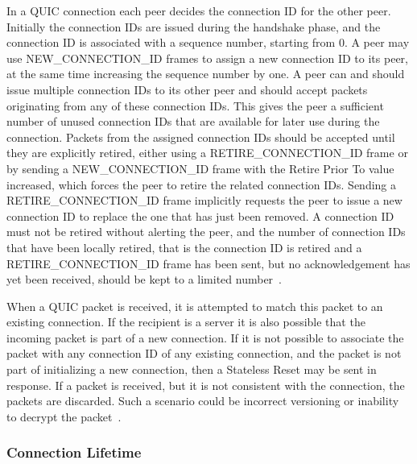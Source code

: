 \documentclass[english, 12pt, a4paper, elec, utf8, a-2b, online]{aaltothesis}
\begin{document}
In a QUIC connection each peer decides the connection ID for the other peer. Initially
the connection IDs are issued during the handshake phase, and the connection ID is
associated with a sequence number, starting from 0. A peer may use NEW\_CONNECTION\_ID frames
to assign a new connection ID to its peer, at the same time increasing the sequence
number by one. A peer can and should issue multiple connection IDs to its other peer
and should accept packets originating from any of these connection IDs. This gives the peer
a sufficient number of unused connection IDs that are available for later use during
the connection. Packets from the assigned connection IDs should be accepted until
they are explicitly retired, either using a RETIRE\_CONNECTION\_ID frame or by
sending a NEW\_CONNECTION\_ID frame with the Retire Prior To value increased, which
forces the peer to retire the related connection IDs. Sending a RETIRE\_CONNECTION\_ID
frame implicitly requests the peer to issue a new connection ID to replace the one
that has just been removed. A connection ID must not be retired without alerting the peer,
and the number of connection IDs that have been locally retired, that is the connection
ID is retired and a RETIRE\_CONNECTION\_ID frame has been sent, but no acknowledgement
has yet been received, should be kept to a limited number~\cite{rfc9000}.

When a QUIC packet is received, it is attempted to match this packet to an existing
connection. If the recipient is a server it is also possible that the incoming
packet is part of a new connection. If it is not possible to associate the packet
with any connection ID of any existing connection, and the packet is not part of
initializing a new connection, then a Stateless Reset may be sent in response. If
a packet is received, but it is not consistent with the connection, the packets
are discarded. Such a scenario could be incorrect versioning or inability to
decrypt the packet~\cite{rfc9000}.

\subsubsection{Connection Lifetime}
\end{document}
